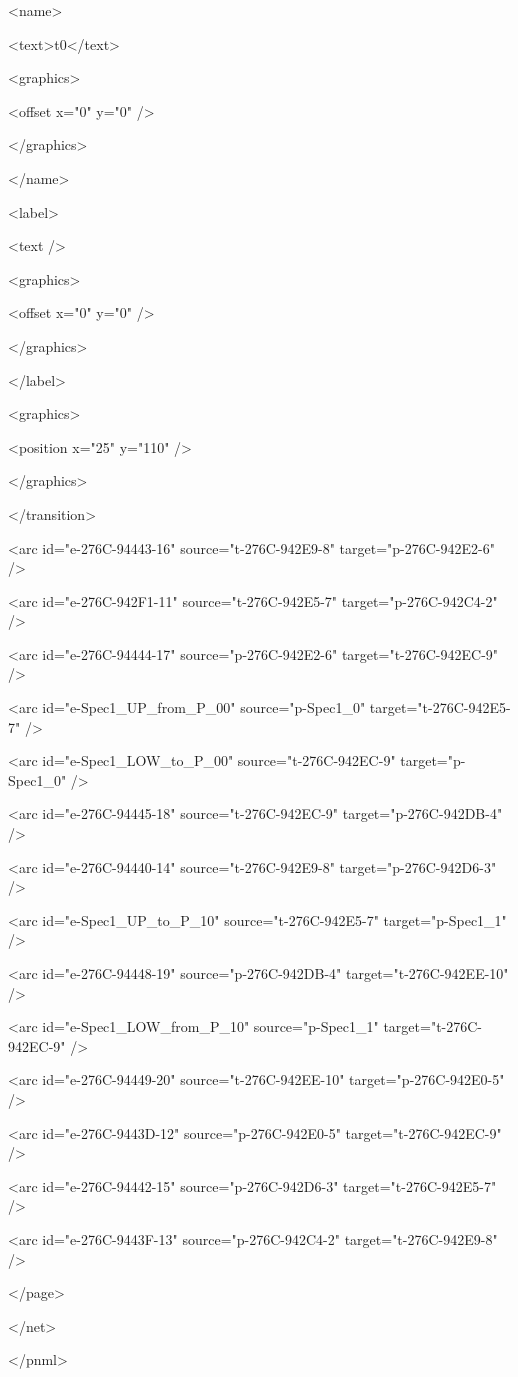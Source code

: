 <name>

<text>t0</text>

<graphics>

<offset x="0" y="0" />

</graphics>

</name>

<label>

<text />

<graphics>

<offset x="0" y="0" />

</graphics>

</label>

<graphics>

<position x="25" y="110" />

</graphics>

</transition>

<arc id="e-276C-94443-16" source="t-276C-942E9-8" target="p-276C-942E2-6" />

<arc id="e-276C-942F1-11" source="t-276C-942E5-7" target="p-276C-942C4-2" />

<arc id="e-276C-94444-17" source="p-276C-942E2-6" target="t-276C-942EC-9" />

<arc id="e-Spec1\_UP\_from\_P\_00" source="p-Spec1\_0" target="t-276C-942E5-7" />

<arc id="e-Spec1\_LOW\_to\_P\_00" source="t-276C-942EC-9" target="p-Spec1\_0" />

<arc id="e-276C-94445-18" source="t-276C-942EC-9" target="p-276C-942DB-4" />

<arc id="e-276C-94440-14" source="t-276C-942E9-8" target="p-276C-942D6-3" />

<arc id="e-Spec1\_UP\_to\_P\_10" source="t-276C-942E5-7" target="p-Spec1\_1" />

<arc id="e-276C-94448-19" source="p-276C-942DB-4" target="t-276C-942EE-10" />

<arc id="e-Spec1\_LOW\_from\_P\_10" source="p-Spec1\_1" target="t-276C-942EC-9" />

<arc id="e-276C-94449-20" source="t-276C-942EE-10" target="p-276C-942E0-5" />

<arc id="e-276C-9443D-12" source="p-276C-942E0-5" target="t-276C-942EC-9" />

<arc id="e-276C-94442-15" source="p-276C-942D6-3" target="t-276C-942E5-7" />

<arc id="e-276C-9443F-13" source="p-276C-942C4-2" target="t-276C-942E9-8" />

</page>

</net>

</pnml>
